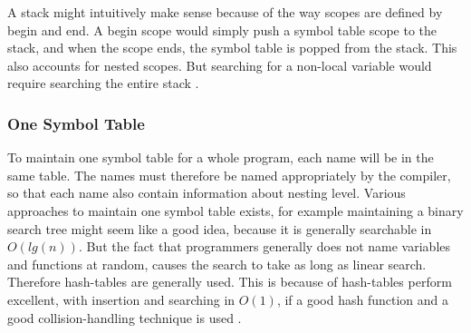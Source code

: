 A stack might intuitively make sense because of the way scopes are defined by begin and end. A begin scope would simply push a symbol table scope to the stack, and when the scope ends, the symbol table is popped from the stack. This also accounts for nested scopes. But searching for a non-local variable would require searching the entire stack \citep{sebesta}. 

\subsubsection*{One Symbol Table}
To maintain one symbol table for a whole program, each name will be in the same table. The names must therefore be named appropriately by the compiler, so that each name also contain information about nesting level. Various approaches to maintain one symbol table exists, for example maintaining a binary search tree might seem like a good idea, because it is generally searchable in $O(lg(n))$. But the fact that programmers generally does not name variables and functions at random, causes the search to take as long as linear search. Therefore hash-tables are generally used. This is because of hash-tables perform excellent, with insertion and searching in $O(1)$, if a good hash function and a good collision-handling technique is used \citep{sebesta}.